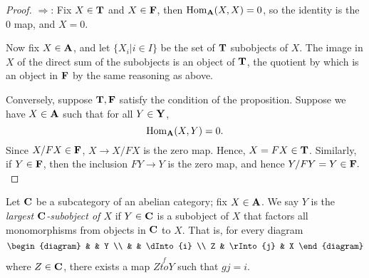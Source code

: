\begin{proof}
\noindent $\Rightarrow$: Fix $X \in \mathbf{T}$ and $X \in \mathbf{F}$, 
then $\mathrm{Hom}_{\mathbf{A}}(X,X) = 0$, so the identity is the 0 map, and
$X = 0$.

Now fix $X \in \mathbf{A}$, and let $\{X_i | i \in I\}$ be the set
of $\mathbf{T}$ subobjects of $X$. The image in $X$ of the direct 
sum of the subobjects is an object of $\mathbf{T}$, the quotient by 
which is an object in $\mathbf{F}$ by the same reasoning as above.

Conversely, suppose $\mathbf{T}, \mathbf{F}$ satisfy the condition of 
the proposition. Suppose we have $X \in \mathbf{A}$ such that for all
$Y \in \mathbf{Y}$,
\[
\mathrm{Hom}_{\mathbf{A}}(X, Y) = 0.
\]
Since $X/FX \in \mathbf{F}$, $X \to X/FX$ is the zero map. Hence, $X 
= FX \in \mathbf{T}$. Similarly, if $Y \in \mathbf{F}$, then the 
inclusion $FY \to Y$ is the zero map, and hence $Y/FY = Y \in 
\mathbf{F}.$
\end{proof}

\begin{definition}
Let $\mathbf{C}$ be a subcategory of an abelian category; fix $X \in
\mathbf{A}$. We say $Y$ is the \emph{largest $\mathbf{C}$-subobject of 
$X$} if $Y \in \mathbf{C}$ is a subobject of $X$ that factors all 
monomorphisms from objects in $\mathbf{C}$ to $X$. That is, for 
every diagram
\[
\begin{diagram}
  &           & Y         \\
  &           & \dInto{i} \\
Z & \rInto{j} & X
\end{diagram}
\]
where $Z \in \mathbf{C}$, there exists a map $Z \stackrel{f}{to} Y$ 
such that $gj = i$.
\end{definition}


